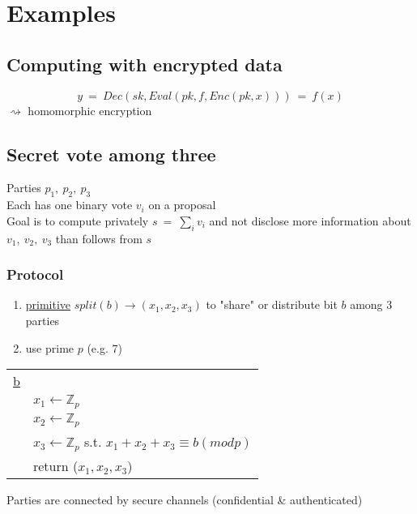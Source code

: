 \documentclass{report}
\begin{document}
 \section{Examples}
 \begin{adjustwidth}{2em}{2em}
 	\subsection{Computing with encrypted data}
 	\begin{adjustwidth}{2em}{2em}
 		\begin{center}\begin{tikzpicture}
 		\end{tikzpicture}\end{center}
 		\[
 			y \ = \ Dec(sk, Eval(pk, f, Enc(pk, x))) \ = \ f(x)
 		\]
 		$\rightsquigarrow$ homomorphic encryption
 	\end{adjustwidth}
 	\subsection{Secret vote among three}
 	\begin{adjustwidth}{2em}{2em}
 		Parties $p_1, \ p_2, \ p_3$ \\
 		Each has one binary vote $v_i$ on a proposal \\
 		Goal is to compute privately $s \ = \ \sum_i v_i$ and not disclose more information about $v_1, \ v_2, \ v_3$ than follows from $s$
 		\subsubsection{Protocol}
 		\begin{adjustwidth}{2em}{}
 			\begin{enumerate}[-]
 				\item \underline{primitive} $split(b) \rightarrow (x_1, x_2, x_3)$ to "share" or distribute bit $b$ among 3 parties
 				\item use prime $p$ (e.g. 7)
 			\end{enumerate}
 			\begin{tabular}{ll}
 				\underline{b} \\
 				& $x_1 \leftarrow \mathbb{Z}_p$ \\
 				& $x_2 \leftarrow \mathbb{Z}_p$ \\
 				& $x_3 \leftarrow \mathbb{Z}_p$ s.t. $x_1 + x_2 + x_3 \equiv b (mod p)$\\
 				& return ($x_1 , x_2, x_3$)
 			\end{tabular}
 			Parties are connected by secure channels (confidential \& authenticated)
 		\end{adjustwidth}

\end{adjustwidth}
\end{adjustwidth}
\end{document}
